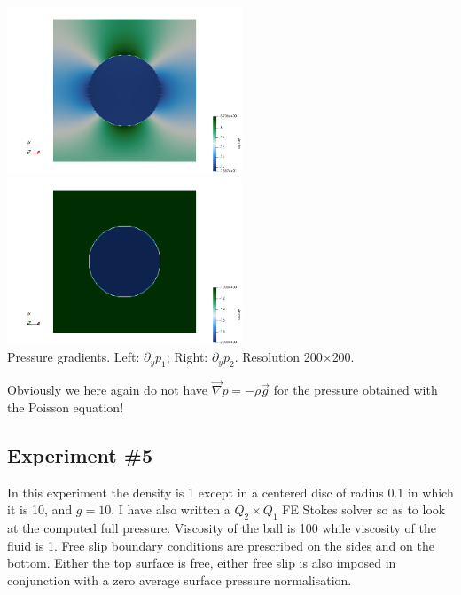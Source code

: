\begin{center}
\includegraphics[width=7cm]{python_codes/fieldstone_119/results/exp4/dp1dy}
\includegraphics[width=7cm]{python_codes/fieldstone_119/results/exp4/dp2dy}\\
{\captionfont Pressure gradients. Left: $\partial_yp_1$; Right: $\partial_yp_2$. Resolution 200$\times$200.}
\end{center}

Obviously we here again do not have $\vec{\nabla}p=-\rho\vec{g}$ for the pressure obtained with 
the Poisson equation!

\newpage
\subsection*{Experiment \#5}

In this experiment the density is 1 except in a centered disc of radius 0.1 in which it is 10, 
and $g=10$. 
I have also written a $Q_2\times Q_1$ FE Stokes solver so as to look at the computed 
full pressure. Viscosity of the ball is 100 while viscosity of the fluid is 1. 
Free slip boundary conditions are prescribed on the sides and on the bottom. 
Either the top surface is free, either free slip is also imposed in 
conjunction with a zero average surface pressure normalisation.


